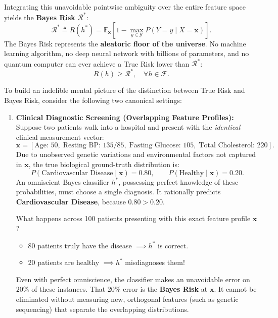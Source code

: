 Integrating this unavoidable pointwise ambiguity over the entire feature space yields the \textbf{Bayes Risk} $\mathcal{R}^*$:
\begin{equation}
\mathcal{R}^* \triangleq R(h^*) = \mathbb{E}_{\mathbf{x}}\left[ 1 - \max_{y \in \mathcal{Y}} P(Y = y \mid X = \mathbf{x}) \right].
\label{eq:bayes_risk_formula}
\end{equation}
The Bayes Risk represents the \textbf{aleatoric floor of the universe}. No machine learning algorithm, no deep neural network with billions of parameters, and no quantum computer can ever achieve a True Risk lower than $\mathcal{R}^*$:
\begin{equation}
R(h) \ge \mathcal{R}^*, \quad \forall h \in \mathcal{F}.
\end{equation}

\begin{example}
\label{ex:bayes_risk_intuition}
To build an indelible mental picture of the distinction between True Risk and Bayes Risk, consider the following two canonical settings:

\begin{enumerate}[leftmargin=*]
  \item \textbf{Clinical Diagnostic Screening (Overlapping Feature Profiles):}  
  Suppose two patients walk into a hospital and present with the \emph{identical} clinical measurement vector:
  \begin{equation*}
  \mathbf{x} = [\text{Age: } 50, \; \text{Resting BP: } 135/85, \; \text{Fasting Glucose: } 105, \; \text{Total Cholesterol: } 220].
  \end{equation*}
  Due to unobserved genetic variations and environmental factors not captured in $\mathbf{x}$, the true biological ground-truth distribution is:
  \begin{equation*}
  P(\text{Cardiovascular Disease} \mid \mathbf{x}) = 0.80, \qquad P(\text{Healthy} \mid \mathbf{x}) = 0.20.
  \end{equation*}
  An omniscient Bayes classifier $h^*$, possessing perfect knowledge of these probabilities, must choose a single diagnosis. It rationally predicts \textbf{Cardiovascular Disease}, because $0.80 > 0.20$.
  
  What happens across 100 patients presenting with this exact feature profile $\mathbf{x}$? 
  \begin{itemize}[noitemsep]
    \item 80 patients truly have the disease $\implies h^*$ is correct.
    \item 20 patients are healthy $\implies h^*$ misdiagnoses them!
  \end{itemize}
  Even with perfect omniscience, the classifier makes an unavoidable error on $20\%$ of these instances. That $20\%$ error is the \textbf{Bayes Risk} at $\mathbf{x}$. It cannot be eliminated without measuring new, orthogonal features (such as genetic sequencing) that separate the overlapping distributions.
  

\end{enumerate}
\end{example}
